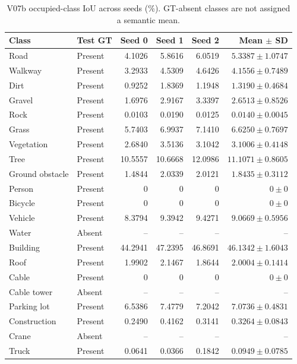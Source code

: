\begin{table}[t]
\centering
\caption{V07b occupied-class IoU across seeds (\%). GT-absent classes are not
assigned a semantic mean.}
\label{tab:v07b-class-seeds}
\small
\setlength{\tabcolsep}{7pt}
\begin{tabular}{llrrrr}
\toprule
Class & Test GT & Seed 0 & Seed 1 & Seed 2 & Mean $\pm$ SD \\
\midrule
Road & Present & 4.1026 & 5.8616 & 6.0519 & $5.3387\pm1.0747$ \\
Walkway & Present & 3.2933 & 4.5309 & 4.6426 & $4.1556\pm0.7489$ \\
Dirt & Present & 0.9252 & 1.8369 & 1.1948 & $1.3190\pm0.4684$ \\
Gravel & Present & 1.6976 & 2.9167 & 3.3397 & $2.6513\pm0.8526$ \\
Rock & Present & 0.0103 & 0.0190 & 0.0125 & $0.0140\pm0.0045$ \\
Grass & Present & 5.7403 & 6.9937 & 7.1410 & $6.6250\pm0.7697$ \\
Vegetation & Present & 2.6840 & 3.5136 & 3.1042 & $3.1006\pm0.4148$ \\
Tree & Present & 10.5557 & 10.6668 & 12.0986 & $11.1071\pm0.8605$ \\
Ground obstacle & Present & 1.4844 & 2.0339 & 2.0121 & $1.8435\pm0.3112$ \\
Person & Present & 0 & 0 & 0 & $0\pm0$ \\
Bicycle & Present & 0 & 0 & 0 & $0\pm0$ \\
Vehicle & Present & 8.3794 & 9.3942 & 9.4271 & $9.0669\pm0.5956$ \\
Water & Absent & -- & -- & -- & -- \\
Building & Present & 44.2941 & 47.2395 & 46.8691 & $46.1342\pm1.6043$ \\
Roof & Present & 1.9902 & 2.1467 & 1.8644 & $2.0004\pm0.1414$ \\
Cable & Present & 0 & 0 & 0 & $0\pm0$ \\
Cable tower & Absent & -- & -- & -- & -- \\
Parking lot & Present & 6.5386 & 7.4779 & 7.2042 & $7.0736\pm0.4831$ \\
Construction & Present & 0.2490 & 0.4162 & 0.3141 & $0.3264\pm0.0843$ \\
Crane & Absent & -- & -- & -- & -- \\
Truck & Present & 0.0641 & 0.0366 & 0.1842 & $0.0949\pm0.0785$ \\
\bottomrule
\end{tabular}
\end{table}

